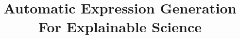 \documentclass[acmsmall,screen]{acmart}
\begin{document}
\title[Automatic Expression Generation For Explainable Science]{Automatic Expression Generation For Explainable Science}
\maketitle





\end{document}
